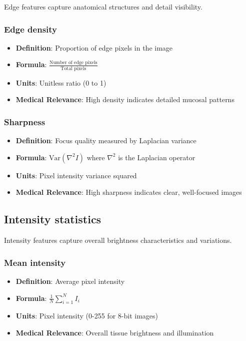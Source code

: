 \documentclass[11pt]{article}
\begin{document}
Edge features capture anatomical structures and detail visibility.

\subsubsection{Edge density}
\begin{itemize}
    \item \textbf{Definition}: Proportion of edge pixels in the image
    \item \textbf{Formula}: $\displaystyle \frac{\text{Number of edge pixels}}{\text{Total pixels}}$
    \item \textbf{Units}: Unitless ratio (0 to 1)
    \item \textbf{Medical Relevance}: High density indicates detailed mucosal patterns
\end{itemize}

\subsubsection{Sharpness}
\begin{itemize}
    \item \textbf{Definition}: Focus quality measured by Laplacian variance
    \item \textbf{Formula}: $\text{Var}(\nabla^2 I)$ where $\nabla^2$ is the Laplacian operator
    \item \textbf{Units}: Pixel intensity variance squared
    \item \textbf{Medical Relevance}: High sharpness indicates clear, well-focused images
\end{itemize}

\subsection{Intensity statistics}

Intensity features capture overall brightness characteristics and variations.

\subsubsection{Mean intensity}
\begin{itemize}
    \item \textbf{Definition}: Average pixel intensity
    \item \textbf{Formula}: $\displaystyle \frac{1}{N}\sum_{i=1}^N I_i$
    \item \textbf{Units}: Pixel intensity (0-255 for 8-bit images)
    \item \textbf{Medical Relevance}: Overall tissue brightness and illumination
\end{itemize}
\end{document}
